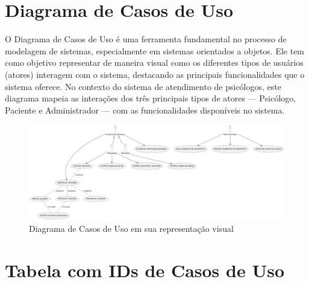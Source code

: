 \documentclass[a4paper,12pt]{report}
\begin{document}
\section{Diagrama de Casos de Uso}

O Diagrama de Casos de Uso é uma ferramenta fundamental no processo de modelagem de sistemas, especialmente em sistemas orientados a objetos. Ele tem como objetivo representar de maneira visual como os diferentes tipos de usuários (atores) interagem com o sistema, destacando as principais funcionalidades que o sistema oferece. No contexto do sistema de atendimento de psicólogos, este diagrama mapeia as interações dos três principais tipos de atores — Psicólogo, Paciente e Administrador — com as funcionalidades disponíveis no sistema.

\begin{figure}[h!]
    \centering
    \includegraphics[width=1.0\textwidth]{casos de uso.png} %
    \caption{Diagrama de Casos de Uso em sua representação visual}
    \label{fig:exemplo}
\end{figure}

\section{Tabela com IDs de Casos de Uso}
\end{document}
